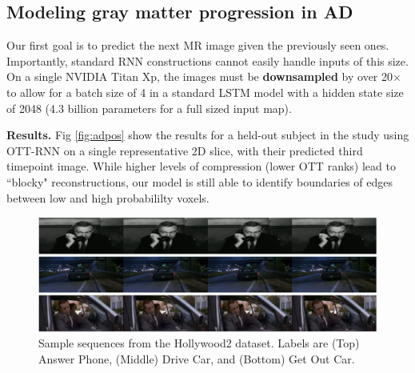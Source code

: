 \subsection{Modeling gray matter progression in AD}
Our first goal is to predict the next MR image
given the previously seen ones. Importantly, standard RNN constructions cannot easily handle inputs of this size.
On a single NVIDIA Titan Xp, the images must be \textbf{downsampled} by over 20$\times$ to allow for a
batch size of 4 in a standard LSTM model with a hidden state size of 2048 (4.3 billion parameters for a full sized input map).

\textbf{Results.}
Fig \ref{fig:adpos} show the results for a held-out subject in the study using OTT-RNN on a single representative 2D slice,
with their predicted third timepoint image. While higher levels of compression (lower OTT ranks) lead to ``blocky" reconstructions,
our model is still able to identify boundaries of edges between low and high probabililty voxels.

\begin{figure}
	\centering
	\includegraphics[width=\columnwidth]{4_ott/figs/Hollywood2_samples.png}
	\caption{\label{fig:hollywood} Sample sequences from the Hollywood2 dataset. Labels are (Top) Answer Phone, (Middle) Drive Car, and (Bottom) Get Out Car.}
\end{figure}

